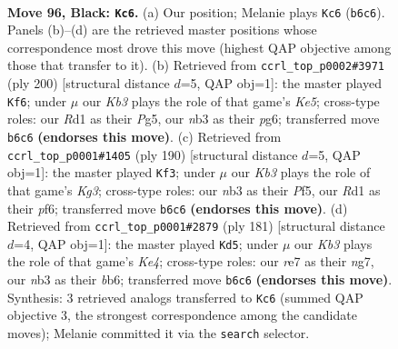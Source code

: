 \documentclass[11pt]{article}
\begin{document}
\clearpage

\begin{figure}[p]\centering
\begin{subfigure}{0.46\textwidth}\centering
\resizebox{\linewidth}{!}{%
\newchessgame
\chessboard[
  setfen={8/4R3/1k6/5K2/8/1N6/6P1/3r4 b - - 57 96},
  showmover=false,
  pgfstyle=straightmove, color=movearrow, markmove={b6-c6}
]}
\caption{}
\end{subfigure}\hfill
\begin{subfigure}{0.46\textwidth}\centering
\resizebox{\linewidth}{!}{%
\newchessgame
\chessboard[
  setfen={6k1/2R5/6p1/4K1P1/7r/8/8/8 w - - 2 101},
  showmover=false,
  pgfstyle=straightmove, color=movearrow, markmove={e5-f6}
]}
\caption{}
\end{subfigure}
\\[4pt]
\begin{subfigure}{0.46\textwidth}\centering
\resizebox{\linewidth}{!}{%
\newchessgame
\chessboard[
  setfen={8/R7/5p1k/5P2/1r6/6K1/8/8 w - - 4 96},
  showmover=false,
  pgfstyle=straightmove, color=movearrow, markmove={g3-f3}
]}
\caption{}
\end{subfigure}\hfill
\begin{subfigure}{0.46\textwidth}\centering
\resizebox{\linewidth}{!}{%
\newchessgame
\chessboard[
  setfen={8/6N1/1B6/4k1P1/2r5/6K1/8/8 b - - 12 91},
  showmover=false,
  pgfstyle=straightmove, color=movearrow, markmove={e5-d5}
]}
\caption{}
\end{subfigure}
\caption{\textbf{Move 96, Black: \texttt{Kc6}.} (a) Our position; Melanie plays \texttt{Kc6} (\texttt{b6c6}). Panels (b)--(d) are the retrieved master positions whose correspondence most drove this move (highest QAP objective among those that transfer to it). (b) Retrieved from \texttt{ccrl\_top\_p0002\#3971} (ply 200) [structural distance $d$=5, QAP obj=1]: the master played \texttt{Kf6}; under $\mu$ our \emph{Kb3} plays the role of that game's \emph{Ke5}; cross-type roles: our \emph{R}d1 as their \emph{P}g5, our \emph{n}b3 as their \emph{p}g6; transferred move \texttt{b6c6} \textbf{(endorses this move)}. (c) Retrieved from \texttt{ccrl\_top\_p0001\#1405} (ply 190) [structural distance $d$=5, QAP obj=1]: the master played \texttt{Kf3}; under $\mu$ our \emph{Kb3} plays the role of that game's \emph{Kg3}; cross-type roles: our \emph{n}b3 as their \emph{P}f5, our \emph{R}d1 as their \emph{p}f6; transferred move \texttt{b6c6} \textbf{(endorses this move)}. (d) Retrieved from \texttt{ccrl\_top\_p0001\#2879} (ply 181) [structural distance $d$=4, QAP obj=1]: the master played \texttt{Kd5}; under $\mu$ our \emph{Kb3} plays the role of that game's \emph{Ke4}; cross-type roles: our \emph{r}e7 as their \emph{n}g7, our \emph{n}b3 as their \emph{b}b6; transferred move \texttt{b6c6} \textbf{(endorses this move)}. Synthesis: 3 retrieved analogs transferred to \texttt{Kc6} (summed QAP objective 3, the strongest correspondence among the candidate moves); Melanie committed it via the \texttt{search} selector.}
\label{fig:thought-m191}
\end{figure}
\end{document}

